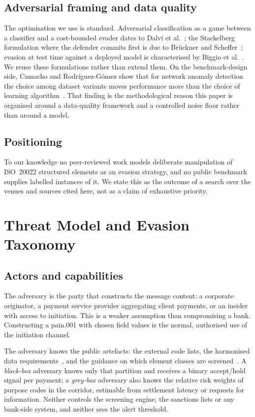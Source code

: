 \documentclass[conference]{IEEEtran}
\begin{document}
\subsection{Adversarial framing and data quality}
The optimisation we use is standard. Adversarial classification as a game
between a classifier and a cost-bounded evader dates to Dalvi et
al.~\cite{dalvi2004}; the Stackelberg formulation where the defender commits
first is due to Brückner and Scheffer~\cite{bruckner2011}; evasion at test
time against a deployed model is characterised by Biggio et
al.~\cite{biggio2013}. We reuse these formulations rather than extend them.
On the benchmark-design side, Camacho and Rodríguez-Gómez show that for
network anomaly detection the choice among dataset variants moves performance
more than the choice of learning algorithm~\cite{camacho2025}. That finding is
the methodological reason this paper is organised around a data-quality
framework and a controlled noise floor rather than around a model.

\subsection{Positioning}
To our knowledge no peer-reviewed work models deliberate manipulation of
ISO~20022 structured elements as an evasion strategy, and no public benchmark
supplies labelled instances of it. We state this as the outcome of a search
over the venues and sources cited here, not as a claim of exhaustive
priority.

\section{Threat Model and Evasion Taxonomy}
\label{sec:threat}

\subsection{Actors and capabilities}
The adversary is the party that constructs the message content: a corporate
originator, a payment service provider aggregating client payments, or an
insider with access to initiation. This is a weaker assumption than
compromising a bank. Constructing a pain.001 with chosen field values is the
normal, authorised use of the initiation channel.

The adversary knows the public artefacts: the external code lists, the
harmonised data requirements~\cite{cpmi2026}, and the guidance on which
element classes are screened~\cite{swiftgp2021}. A \emph{black-box}
adversary knows only that partition and receives a binary accept/hold signal
per payment; a \emph{grey-box} adversary also knows the relative risk
weights of purpose codes in the corridor, estimable from settlement latency
or requests for information. Neither controls the screening engine, the
sanctions lists or any bank-side system, and neither sees the alert
threshold.
\end{document}
